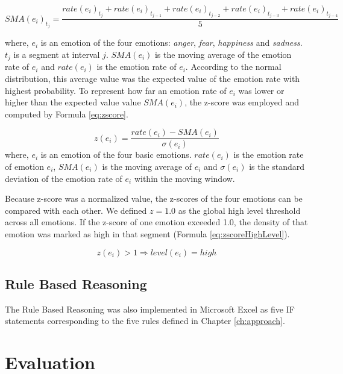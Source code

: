 \begin{equation}
\label{eq:movingAvg}
	SMA(e_i)_{t_j} = \frac{ rate(e_i)_{t_j} + rate(e_i)_{t_{j-1}} + rate(e_i)_{t_{j-2}} + rate(e_i)_{t_{j-3}} + rate(e_i)_{t_{j-4}} }{5}
\end{equation} 

where, \(e_i\) is an emotion of the four emotions: \textit{anger}, \textit{fear}, \textit{happiness} and \textit{sadness}. \(t_j\) is a segment at interval \(j\). \(SMA(e_i)\) is the moving average of the emotion rate of \(e_i\) and \(rate(e_i)\) is the emotion rate of \(e_i\). According to the normal distribution, this average value was the expected value of the emotion rate with highest probability. To represent how far an emotion rate of \(e_i\) was lower or higher than the expected value value \(SMA(e_i)\), the z-score was employed and computed by Formula \ref{eq:zscore}.

\begin{equation}
\label{eq:zscore}
	z(e_i) = \frac{rate(e_i) - SMA(e_i)}{\sigma(e_i)}
\end{equation}
where, \(e_i\) is an emotion of the four basic emotions. \(rate(e_i)\) is the emotion rate of emotion \(e_i\), \(SMA(e_i)\) is the moving average of \(e_i\) and \(\sigma(e_i)\) is the standard deviation of the emotion rate of \(e_i\) within the moving window. 

Because z-score was a normalized value, the z-scores of the four emotions can be compared with each other. We defined \(z = 1.0\) as the global high level threshold across all emotions. If the z-score of one emotion exceeded 1.0, the density of that emotion was marked as high in that segment (Formula \ref{eq:zscoreHighLevel}).

\begin{equation}
\label{eq:zscoreHighLevel}
	z(e_i) > 1 \Rightarrow level(e_i) = high
\end{equation} 

\subsection{Rule Based Reasoning}
The Rule Based Reasoning was also implemented in Microsoft Excel as five IF statements corresponding to the five rules defined in Chapter \ref{ch:approach}. 

\section{Evaluation}
\label{sec:evaluation}
